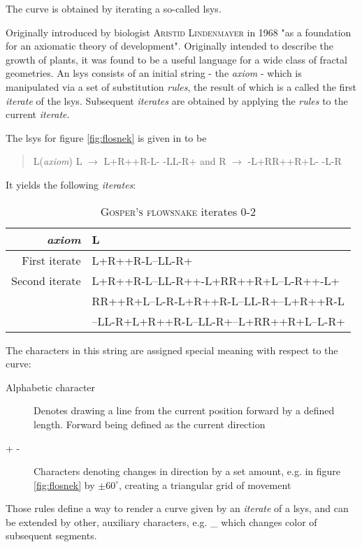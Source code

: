 The curve is obtained by iterating a so-called \gls{lsys}.

Originally introduced by biologist \textsc{Aristid Lindenmayer} in 1968 "as a foundation for an axiomatic theory of development"\citep[Preface]{Prusinkiewicz2013}. Originally intended to describe the growth of plants, it was found to be a useful language for a wide class of fractal geometries.
An \gls{lsys} consists of an initial string - the \textit{axiom} - which is manipulated via a set of substitution \textit{rules}, the result of which is a called the first \textit{iterate} of the \gls{lsys}. Subsequent \textit{iterates} are obtained by applying the \textit{rules} to the current \textit{iterate}.

The \gls{lsys} for figure \ref{fig:flosnek} is given in \citet[p.7]{Arndt2016} to be 
\begin{quote}
	\centering
	L(\textit{axiom}) \quad L $\rightarrow$ L+R++R-L- -LL-R+ \quad and \quad R $\rightarrow$ -L+RR++R+L- -L-R
\end{quote}

It yields the following \textit{iterates}:\\
\begin{table}[htb]
\begin{tabular}{r|l}\hline
\textit{axiom}& L\\\hline
First iterate 	& L+R++R-L--LL-R+\\\hline
Second iterate 	& L+R++R-L--LL-R++-L+RR++R+L--L-R++-L+\\
		& RR++R+L--L-R-L+R++R-L--LL-R+--L+R++R-L\\
		& --LL-R+L+R++R-L--LL-R+--L+RR++R+L--L-R+\\\hline
\end{tabular}
\caption{\textsc{Gosper's flowsnake} iterates 0-2}
\label{desc:lsysit}
\end{table}

The characters in this string are assigned special meaning with respect to the curve:
\begin{description}
	\item[Alphabetic character] Denotes drawing a line from the current position forward by a defined length. Forward being defined as the current direction
	\item[+ -] Characters denoting changes in direction by a set amount, e.g. in figure \ref{fig:flosnek} by $\pm60^\circ$, creating a triangular grid of movement
\end{description}

Those rules define a way to render a curve given by an \textit{iterate} of a \gls{lsys}, and can be extended by other, auxiliary characters, e.g. \_ which changes color of subsequent segments.

